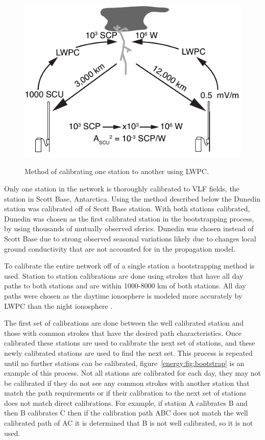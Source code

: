 \begin{figure}[ht!]
\centering
\includegraphics[scale=1]{energy/Figures/PPS_Method.pdf}\\
\caption{Method of calibrating one station to another using LWPC.}
\label{energy:fig:calibrate}
\end{figure}

Only one station in the network is thoroughly calibrated to VLF fields, the station in Scott Base, Antarctica.
Using the method described below the Dunedin station was calibrated off of Scott Base station.
With both stations calibrated, Dunedin was chosen as the first calibrated station in the bootstrapping process, by using thousands of mutually observed sferics.
Dunedin was chosen instead of Scott Base due to strong observed seasonal variations likely due to changes local ground conductivity that are not accounted for in the propagation model.

To calibrate the entire network off of a single station a bootstrapping method is used.
Station to station calibrations are done using strokes that have all day paths to both stations and are within 1000-8000 km of both stations.
All day paths were chosen as the daytime ionosphere is modeled more accurately by LWPC than the night ionosphere \citep{McRae2000d}.

The first set of calibrations are done between the well calibrated station and those with common strokes that have the desired path characteristics.
Once calibrated these stations are used to calibrate the next set of stations, and these newly calibrated stations are used to find the next set.
This process is repeated until no further stations can be calibrated, figure~\ref{energy:fig:bootstrap} is an example of this process.
Not all stations are calibrated for each day, they may not be calibrated if they do not see any common strokes with another station that match the path requirements or if their calibration to the next set of stations does not match direct calibrations.
For example, if station A calibrates B and then B calibrates C then if the calibration path ABC does not match the well calibrated path of AC it is determined that B is not well calibrated, so it is not used.

